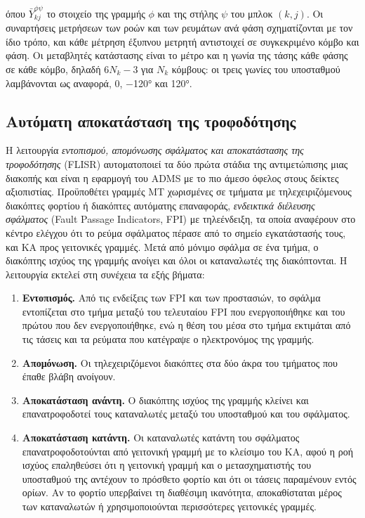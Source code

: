 όπου $\bar{Y}_{kj}^{\phi\psi}$ το στοιχείο της γραμμής $\phi$ και της στήλης $\psi$ του μπλοκ
$(k, j)$. Οι συναρτήσεις μετρήσεων των ροών και των ρευμάτων ανά φάση σχηματίζονται με τον ίδιο
τρόπο, και κάθε μέτρηση έξυπνου μετρητή αντιστοιχεί σε συγκεκριμένο κόμβο και φάση. Οι
μεταβλητές κατάστασης είναι το μέτρο και η γωνία της τάσης κάθε φάσης σε κάθε κόμβο, δηλαδή
$6N_k - 3$ για $N_k$ κόμβους: οι τρεις γωνίες του υποσταθμού λαμβάνονται ως αναφορά, 0, −120°
και 120°.

\subsection{Αυτόματη αποκατάσταση της τροφοδότησης}
\label{sec:flisr}

Η λειτουργία \emph{εντοπισμού, απομόνωσης σφάλματος και αποκατάστασης της τροφοδότησης}
(FLISR) αυτοματοποιεί τα δύο πρώτα στάδια της αντιμετώπισης μιας διακοπής και είναι η
εφαρμογή του ADMS με το πιο άμεσο όφελος στους δείκτες αξιοπιστίας. Προϋποθέτει γραμμές ΜΤ
χωρισμένες σε τμήματα με τηλεχειριζόμενους διακόπτες φορτίου ή διακόπτες αυτόματης
επαναφοράς, \emph{ενδεικτικά διέλευσης σφάλματος} (Fault Passage Indicators, FPI) με
τηλεένδειξη, τα οποία αναφέρουν στο κέντρο ελέγχου ότι το ρεύμα σφάλματος πέρασε από το σημείο
εγκατάστασής τους, και ΚΑ προς γειτονικές γραμμές. Μετά από μόνιμο σφάλμα σε ένα τμήμα, ο
διακόπτης ισχύος της γραμμής ανοίγει και όλοι οι καταναλωτές της διακόπτονται. Η λειτουργία εκτελεί
στη συνέχεια τα εξής βήματα:

\begin{enumerate}
\item \textbf{Εντοπισμός.} Από τις ενδείξεις των FPI και των προστασιών, το σφάλμα
      εντοπίζεται στο τμήμα μεταξύ του τελευταίου FPI που ενεργοποιήθηκε και του πρώτου που δεν ενεργοποιήθηκε, ενώ η θέση του μέσα στο τμήμα
      εκτιμάται από τις τάσεις και τα ρεύματα που κατέγραψε ο ηλεκτρονόμος της γραμμής.
\item \textbf{Απομόνωση.} Οι τηλεχειριζόμενοι διακόπτες στα δύο άκρα του τμήματος που έπαθε
      βλάβη ανοίγουν.
\item \textbf{Αποκατάσταση ανάντη.} Ο διακόπτης ισχύος της γραμμής κλείνει και
      επανατροφοδοτεί τους καταναλωτές μεταξύ του υποσταθμού και του σφάλματος.
\item \textbf{Αποκατάσταση κατάντη.} Οι καταναλωτές κατάντη του σφάλματος επανατροφοδοτούνται
      από γειτονική γραμμή με το κλείσιμο του ΚΑ, αφού η ροή ισχύος
      επαληθεύσει ότι η γειτονική γραμμή και ο μετασχηματιστής του υποσταθμού της αντέχουν
      το πρόσθετο φορτίο και ότι οι τάσεις παραμένουν εντός ορίων. Αν το φορτίο υπερβαίνει τη
      διαθέσιμη ικανότητα, αποκαθίσταται μέρος των καταναλωτών ή χρησιμοποιούνται
      περισσότερες γειτονικές γραμμές.
\end{enumerate}

